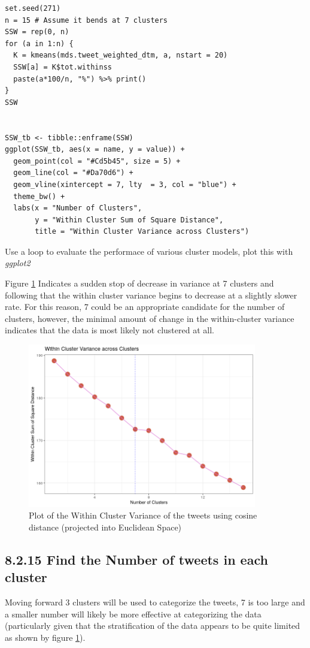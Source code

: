 \documentclass[11pt]{article}
\begin{document}
\begin{listing}[htbp]
\begin{verbatim}
set.seed(271)
n = 15 # Assume it bends at 7 clusters
SSW = rep(0, n)
for (a in 1:n) {
  K = kmeans(mds.tweet_weighted_dtm, a, nstart = 20)
  SSW[a] = K$tot.withinss
  paste(a*100/n, "%") %>% print()
}
SSW


SSW_tb <- tibble::enframe(SSW)
ggplot(SSW_tb, aes(x = name, y = value)) +
  geom_point(col = "#Cd5b45", size = 5) +
  geom_line(col = "#Da70d6") +
  geom_vline(xintercept = 7, lty  = 3, col = "blue") +
  theme_bw() +
  labs(x = "Number of Clusters",
       y = "Within Cluster Sum of Square Distance",
       title = "Within Cluster Variance across Clusters")
\end{verbatim}
\caption{\label{org175fcbd}Use a loop to evaluate the performace of various cluster models, plot this with \emph{ggplot2}}
\end{listing}

Figure \ref{fig:org735acfd} Indicates a sudden stop of decrease in variance at 7 clusters and following that the within cluster variance begins to decrease at a slightly slower rate. For this reason, 7 could be an appropriate candidate for the number of clusters, however, the minimal amount of change in the within-cluster variance indicates that the data is most likely not clustered at all.


\begin{figure}[htbp]
\centering
\includegraphics[width=10cm]{./Figures/Q14WithinClusterVariance.png}
\caption{\label{fig:org735acfd}Plot of the Within Cluster Variance of the tweets using cosine distance (projected into Euclidean Space)}
\end{figure}

\subsection{8.2.15 Find the Number of tweets in each cluster}
\label{sec:org7f98754}
Moving forward 3 clusters will be used to categorize the
tweets, 7 is too large and a smaller number will likely be more effective at
categorizing the data (particularly given that the stratification of the data
appears to be quite limited as shown by figure \ref{fig:org735acfd}).
\end{document}
